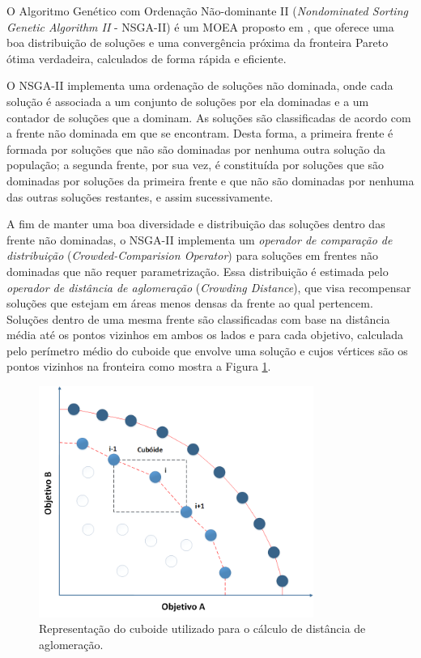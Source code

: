 O Algoritmo Genético com Ordenação Não-dominante II (\emph{Nondominated Sorting Genetic Algorithm II} - NSGA-II) é um MOEA proposto em \cite{deb2002fast}, que oferece uma boa distribuição de soluções e uma convergência próxima da fronteira Pareto ótima verdadeira, calculados de forma rápida e eficiente.

O NSGA-II implementa uma ordenação de soluções não dominada, onde cada solução é associada a um conjunto de soluções por ela dominadas e a um contador de soluções que a dominam. As soluções são classificadas de acordo com a frente não dominada em que se encontram. Desta forma, a primeira frente é formada por soluções que não são dominadas por nenhuma outra solução da população; a segunda frente, por sua vez, é constituída por soluções que são dominadas por soluções da primeira frente e que não são dominadas por nenhuma das outras soluções restantes, e assim sucessivamente.

A fim de manter uma boa diversidade e distribuição das soluções dentro das frente não dominadas, o NSGA-II implementa um \emph{operador de comparação de distribuição} (\emph{Crowded-Comparision Operator}) para soluções em frentes não dominadas que não requer parametrização. Essa distribuição é estimada pelo \emph{operador de distância de aglomeração} (\emph{Crowding Distance}), que visa recompensar soluções que estejam em áreas menos densas da frente ao qual pertencem. Soluções dentro de uma mesma frente são classificadas com base na distância média até os pontos vizinhos em ambos os lados e para cada objetivo, calculada pelo perímetro médio do cuboide que envolve uma solução e cujos vértices são os pontos vizinhos na fronteira como mostra a Figura \ref{fig:nsgaii_cuboid}.

\begin{figure}[htb]
	\begin{center}
		\includegraphics[width=0.8\textwidth]{Imagens/nsgaii_cuboid.png}
		\caption{Representação do cuboide utilizado para o cálculo de distância de aglomeração.}
		\label{fig:nsgaii_cuboid}
	\end{center}
\end{figure}


